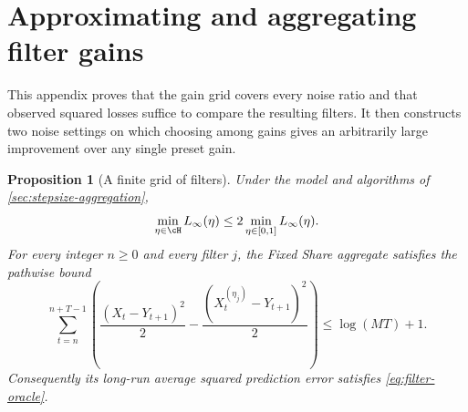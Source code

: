 \documentclass[11pt,twoside]{article}
\newtheorem{proposition}[theorem]{Proposition}
\theoremstyle{definition}
\theoremstyle{remark}
\begin{document}
\section{Approximating and aggregating filter gains}
\label{app:filter-aggregation}

This appendix proves that the gain grid covers every noise ratio and that
observed squared losses suffice to compare the resulting filters. It then
constructs two noise settings on which choosing among gains gives an
arbitrarily large improvement over any single preset gain.

\begin{proposition}[A finite grid of filters]
Under the model and algorithms of \cref{sec:stepsize-aggregation},
\[
 \min_{\eta\in\cH}L_\infty(\eta)
 \le2\min_{\eta\in[0,1]}L_\infty(\eta).
\]
For every integer $n\ge0$ and every filter $j$, the Fixed Share aggregate
satisfies the pathwise bound
\begin{equation}
 \sum_{t=n}^{n+T-1}
 \left(\frac{(X_t-Y_{t+1})^2}{2}
              -\frac{(X_t^{(\eta_j)}-Y_{t+1})^2}{2}\right)
 \le\log(MT)+1.
 \label{eq:filter-block}
\end{equation}
Consequently its long-run average squared prediction error satisfies
\cref{eq:filter-oracle}.
\end{proposition}
\end{document}

